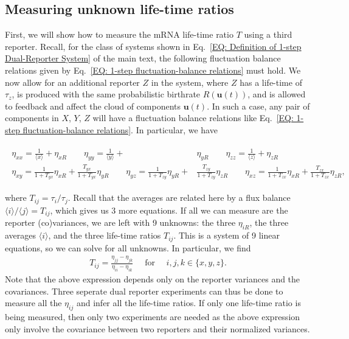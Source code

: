\documentclass[%
 reprint,prx,
superscriptaddress,
%
%
%
%
%
%
%
%
%
 amsmath,amssymb,
 aps,
%
%
%
%
%
%
]{revtex4-2}
\begin{document}
{{\subsection{Measuring unknown life-time ratios}
\label{SEC: Appendix inferring unknown lifetime ratios}
First, we will show how to measure the mRNA life-time ratio $T$ using a third reporter. Recall, for the class of systems shown in Eq.~\eqref{EQ: Definition of 1-step Dual-Reporter System} of the main text, the following fluctuation balance relations given by  Eq.~\eqref{EQ: 1-step fluctuation-balance relations} must hold. We now allow for an additional reporter $Z$ in the system, where $Z$ has a life-time of $\tau_{z}$, is produced with the same probabilistic birthrate $R(\mathbf{u}(t))$, and is allowed to feedback and affect the cloud of components $\mathbf{u}(t)$. In such a case, any 
pair of components in $X$, $Y$, $Z$ will have a fluctuation balance relations like Eq.~\eqref{EQ: 1-step fluctuation-balance relations}. In particular, we have 
\begin{widetext}
\begin{align*}
 \begin{split}
  \eta_{xx} = \frac{1}{\langle x \rangle} + \eta_{xR} \quad \quad  \eta_{yy} = \frac{1}{\langle y \rangle} + & \eta_{yR} \quad \quad  \eta_{zz} = \frac{1}{\langle z \rangle} + \eta_{zR} \\
  \eta_{xy} = \frac{1}{1 + T_{yx}}\eta_{xR} + \frac{T_{yx}}{1 + T_{yx}}\eta_{yR} \quad \quad \eta_{yz} = \frac{1}{1 + T_{zy}}\eta_{yR} + & \frac{T_{zy}}{1 + T_{zy}}\eta_{zR} \quad \quad \eta_{xz} = \frac{1}{1 + T_{zx}}\eta_{xR} + \frac{T_{zx}}{1 + T_{zx}}\eta_{zR} ,
 \end{split}
%
\end{align*}
\end{widetext}
where $T_{ij} = \tau_{i}/ \tau_{j}$. Recall that the averages are related here by a flux balance $\langle i \rangle / \langle j \rangle = T_{ij}$, which gives us 
3 more equations. If all we can measure are the reporter (co)variances, we are left with 9 unknowns: the three $\eta_{iR}$, the three averages 
$\langle i \rangle$, and the three life-time ratios $T_{ij}$. This is a system of 9 linear equations, 
so we can solve for all unknowns. In particular, we find 
\begin{align}
 T_{ij} = \frac{\eta_{jj} - \eta_{jk}}{\eta_{ii} - \eta_{ik}} \quad \text{ for } \quad i,j,k\in \{x,y,z\} .
\end{align}
Note that the above expression depends only on the reporter variances and the covariances. Three seperate dual reporter experiments can thus be done to measure all the $\eta_{ij}$ 
and infer all the life-time ratios. If only one life-time ratio is being measured, then only two experiments are needed as the above expression only involve the covariance between two reporters and their normalized variances. 

}}
\end{document}
